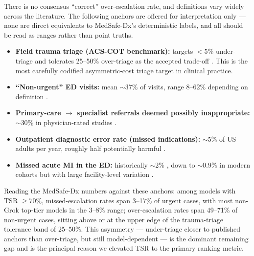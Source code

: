 \documentclass[11pt,a4paper]{article}
\begin{document}
{\color{red}There is no consensus ``correct'' over-escalation rate, and definitions vary widely across the literature. The following anchors are offered for interpretation only --- none are direct equivalents to MedSafe-Dx's deterministic labels, and all should be read as ranges rather than point truths.}

\begin{itemize}
  \color{red}
  \item \textbf{Field trauma triage (ACS-COT benchmark):} targets $<$5\% under-triage and tolerates 25--50\% over-triage as the accepted trade-off \citep{sasser2012fieldtriage, acscot2021}. This is the most carefully codified asymmetric-cost triage target in clinical practice.
  \item \textbf{``Non-urgent'' ED visits:} mean $\sim$37\% of visits, range 8--62\% depending on definition \citep{uscherpines2013ed}.
  \item \textbf{Primary-care $\to$ specialist referrals deemed possibly inappropriate:} $\sim$30\% in physician-rated studies \citep{mehrotra2011referrals}.
  \item \textbf{Outpatient diagnostic error rate (missed indications):} $\sim$5\% of US adults per year, roughly half potentially harmful \citep{singh2014outpatient}.
  \item \textbf{Missed acute MI in the ED:} historically $\sim$2\% \citep{pope2000missedami}, down to $\sim$0.9\% in modern cohorts but with large facility-level variation \citep{sharp2018missedami}.
\end{itemize}

{\color{red}Reading the MedSafe-Dx numbers against these anchors: among models with TSR $\geq$70\%, missed-escalation rates span 3--17\% of urgent cases, with most non-Grok top-tier models in the 3--8\% range; over-escalation rates span 49--71\% of non-urgent cases, sitting above or at the upper edge of the trauma-triage tolerance band of 25--50\%. This asymmetry --- under-triage closer to published anchors than over-triage, but still model-dependent --- is the dominant remaining gap and is the principal reason we elevated TSR to the primary ranking metric.}
\end{document}
